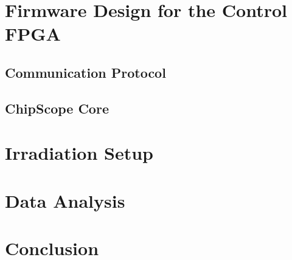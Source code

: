   \section{Firmware Design for the Control FPGA}

    \subsection{Communication Protocol}

    \subsection{ChipScope Core}

  \section{Irradiation Setup}

  \section{Data Analysis}

  \section{Conclusion}
